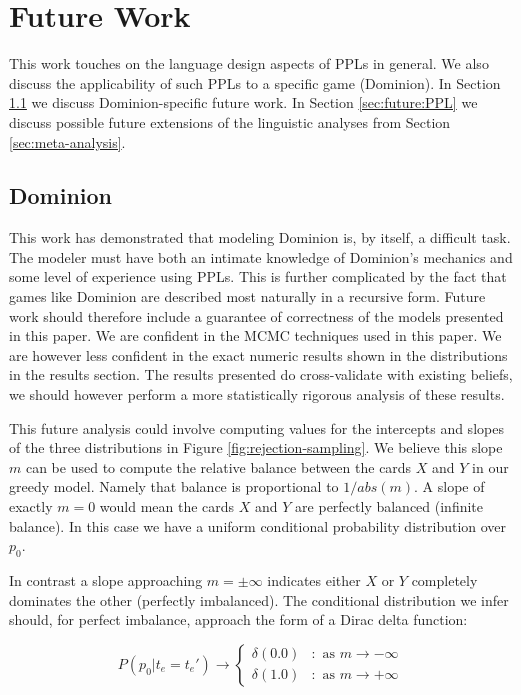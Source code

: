 
\section{Future Work} \label{sec:future}

This work touches on the language design aspects of PPLs
in general. We also discuss the applicability of such PPLs
to a specific game (Dominion). In Section \ref{sec:future:dominion}
we discuss Dominion-specific future work. In Section \ref{sec:future:PPL}
we discuss possible future extensions of the linguistic analyses from
Section \ref{sec:meta-analysis}.

\subsection{Dominion} \label{sec:future:dominion}

This work has demonstrated that modeling Dominion is, by itself,
a difficult task. The modeler must have both an intimate knowledge
of Dominion's mechanics and some level of experience using PPLs.
This is further complicated by the fact that games like Dominion
are described most naturally in a recursive form. Future work should
therefore include a guarantee of correctness of the models presented
in this paper. We are confident in the MCMC techniques used in this
paper. We are however less confident in the exact numeric results
shown in the distributions in the results section. The results
presented do cross-validate with existing beliefs, we should however
perform a more statistically rigorous analysis of these
results.

This future analysis could involve computing values for the
intercepts and slopes of the three distributions in Figure
\ref{fig:rejection-sampling}. We believe this slope $m$ can be used
to compute the relative balance between the cards $X$ and $Y$ in
our greedy model. Namely that balance is proportional to
$1 / abs(m)$. A slope of exactly $m = 0$ would mean the cards
$X$ and $Y$ are perfectly balanced (infinite balance). In
this case we have a uniform conditional probability distribution
over $p_0$.

In contrast
a slope approaching $m = \pm \infty$ indicates either $X$ or $Y$
completely dominates the other (perfectly imbalanced). The
conditional distribution we infer should, for perfect imbalance,
approach the form of a Dirac delta function:

$$P(p_0 | t_e = t_e') \rightarrow \left\{
  \begin{array}{lr}
    \delta(0.0) & : \textrm{ as } m \rightarrow -\infty \\
    \delta(1.0) & : \textrm{ as } m \rightarrow +\infty
  \end{array}
\right.
$$


